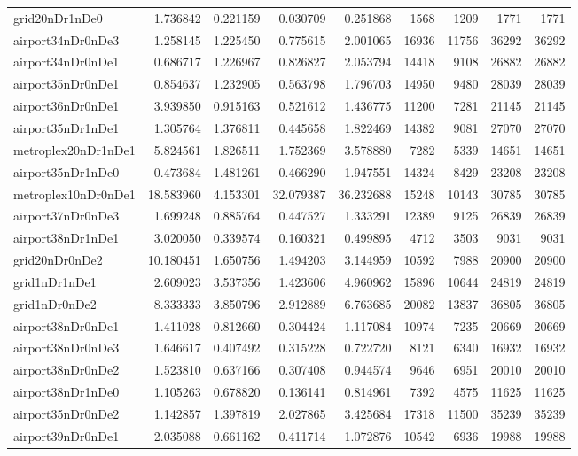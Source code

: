 \begin{longtable}{|l|r|r|r|r|r|r|r|r|}
grid20nDr1nDe0 & 1.736842 & 0.221159 & 0.030709 & 0.251868 & 1568 & 1209 & 1771 & 1771 \\
airport34nDr0nDe3 & 1.258145 & 1.225450 & 0.775615 & 2.001065 & 16936 & 11756 & 36292 & 36292 \\
airport34nDr0nDe1 & 0.686717 & 1.226967 & 0.826827 & 2.053794 & 14418 & 9108 & 26882 & 26882 \\
airport35nDr0nDe1 & 0.854637 & 1.232905 & 0.563798 & 1.796703 & 14950 & 9480 & 28039 & 28039 \\
airport36nDr0nDe1 & 3.939850 & 0.915163 & 0.521612 & 1.436775 & 11200 & 7281 & 21145 & 21145 \\
airport35nDr1nDe1 & 1.305764 & 1.376811 & 0.445658 & 1.822469 & 14382 & 9081 & 27070 & 27070 \\
metroplex20nDr1nDe1 & 5.824561 & 1.826511 & 1.752369 & 3.578880 & 7282 & 5339 & 14651 & 14651 \\
airport35nDr1nDe0 & 0.473684 & 1.481261 & 0.466290 & 1.947551 & 14324 & 8429 & 23208 & 23208 \\
metroplex10nDr0nDe1 & 18.583960 & 4.153301 & 32.079387 & 36.232688 & 15248 & 10143 & 30785 & 30785 \\
airport37nDr0nDe3 & 1.699248 & 0.885764 & 0.447527 & 1.333291 & 12389 & 9125 & 26839 & 26839 \\
airport38nDr1nDe1 & 3.020050 & 0.339574 & 0.160321 & 0.499895 & 4712 & 3503 & 9031 & 9031 \\
grid20nDr0nDe2 & 10.180451 & 1.650756 & 1.494203 & 3.144959 & 10592 & 7988 & 20900 & 20900 \\
grid1nDr1nDe1 & 2.609023 & 3.537356 & 1.423606 & 4.960962 & 15896 & 10644 & 24819 & 24819 \\
grid1nDr0nDe2 & 8.333333 & 3.850796 & 2.912889 & 6.763685 & 20082 & 13837 & 36805 & 36805 \\
airport38nDr0nDe1 & 1.411028 & 0.812660 & 0.304424 & 1.117084 & 10974 & 7235 & 20669 & 20669 \\
airport38nDr0nDe3 & 1.646617 & 0.407492 & 0.315228 & 0.722720 & 8121 & 6340 & 16932 & 16932 \\
airport38nDr0nDe2 & 1.523810 & 0.637166 & 0.307408 & 0.944574 & 9646 & 6951 & 20010 & 20010 \\
airport38nDr1nDe0 & 1.105263 & 0.678820 & 0.136141 & 0.814961 & 7392 & 4575 & 11625 & 11625 \\
airport35nDr0nDe2 & 1.142857 & 1.397819 & 2.027865 & 3.425684 & 17318 & 11500 & 35239 & 35239 \\
airport39nDr0nDe1 & 2.035088 & 0.661162 & 0.411714 & 1.072876 & 10542 & 6936 & 19988 & 19988 \\

\end{longtable}
